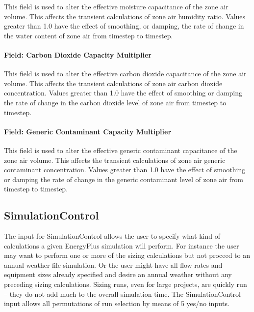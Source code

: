 This field is used to alter the effective moisture capacitance of the zone air volume. This affects the transient calculations of zone air humidity ratio. Values greater than 1.0 have the effect of smoothing, or damping, the rate of change in the water content of zone air from timestep to timestep.

\paragraph{Field: Carbon Dioxide Capacity Multiplier}\label{field-carbon-dioxide-capacity-multiplier}

This field is used to alter the effective carbon dioxide capacitance of the zone air volume. This affects the transient calculations of zone air carbon dioxide concentration. Values greater than 1.0 have the effect of smoothing or damping the rate of change in the carbon dioxide level of zone air from timestep to timestep.

\paragraph{Field: Generic Contaminant Capacity Multiplier}\label{field-generic-contaminant-capacity-multiplier}

This field is used to alter the effective generic contaminant capacitance of the zone air volume. This affects the transient calculations of zone air generic contaminant concentration. Values greater than 1.0 have the effect of smoothing or damping the rate of change in the generic contaminant level of zone air from timestep to timestep.

\subsection{SimulationControl}\label{simulationcontrol}

The input for SimulationControl allows the user to specify what kind of calculations a given EnergyPlus simulation will perform. For instance the user may want to perform one or more of the sizing calculations but not proceed to an annual weather file simulation. Or the user might have all flow rates and equipment sizes already specified and desire an annual weather without any preceding sizing calculations. Sizing runs, even for large projects, are quickly run -- they do not add much to the overall simulation time. The SimulationControl input allows all permutations of run selection by means of 5 yes/no inputs.

